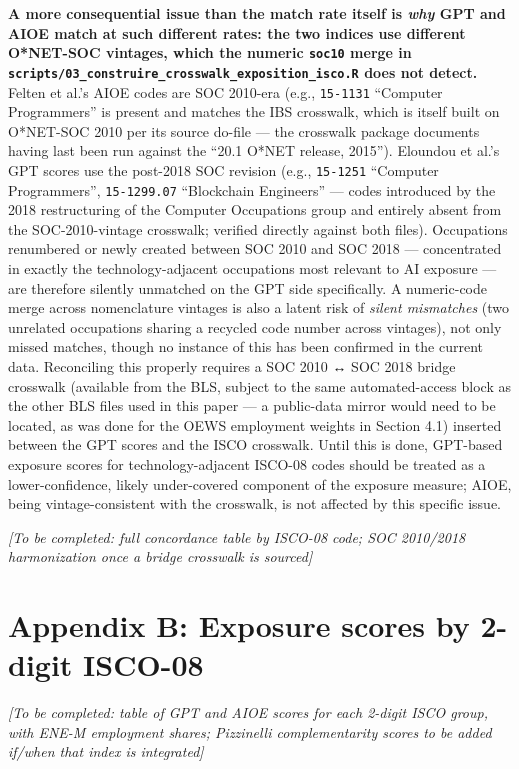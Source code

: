 \documentclass[
  11pt,
]{article}
\begin{document}
\textbf{A more consequential issue than the match rate itself is
\emph{why} GPT and AIOE match at such different rates: the two indices
use different O*NET-SOC vintages, which the numeric \texttt{soc10} merge
in \texttt{scripts/03\_construire\_crosswalk\_exposition\_isco.R} does
not detect.} Felten et al.'s AIOE codes are SOC 2010-era (e.g.,
\texttt{15-1131} ``Computer Programmers'' is present and matches the IBS
crosswalk, which is itself built on O*NET-SOC 2010 per its source
do-file --- the crosswalk package documents having last been run against
the ``20.1 O*NET release, 2015''). Eloundou et al.'s GPT scores use the
post-2018 SOC revision (e.g., \texttt{15-1251} ``Computer Programmers'',
\texttt{15-1299.07} ``Blockchain Engineers'' --- codes introduced by the
2018 restructuring of the Computer Occupations group and entirely absent
from the SOC-2010-vintage crosswalk; verified directly against both
files). Occupations renumbered or newly created between SOC 2010 and SOC
2018 --- concentrated in exactly the technology-adjacent occupations
most relevant to AI exposure --- are therefore silently unmatched on the
GPT side specifically. A numeric-code merge across nomenclature vintages
is also a latent risk of \emph{silent mismatches} (two unrelated
occupations sharing a recycled code number across vintages), not only
missed matches, though no instance of this has been confirmed in the
current data. Reconciling this properly requires a SOC 2010 ↔ SOC 2018
bridge crosswalk (available from the BLS, subject to the same
automated-access block as the other BLS files used in this paper --- a
public-data mirror would need to be located, as was done for the OEWS
employment weights in Section 4.1) inserted between the GPT scores and
the ISCO crosswalk. Until this is done, GPT-based exposure scores for
technology-adjacent ISCO-08 codes should be treated as a
lower-confidence, likely under-covered component of the exposure
measure; AIOE, being vintage-consistent with the crosswalk, is not
affected by this specific issue.

\emph{{[}To be completed: full concordance table by ISCO-08 code; SOC
2010/2018 harmonization once a bridge crosswalk is sourced{]}}

\section{Appendix B: Exposure scores by 2-digit
ISCO-08}\label{appendix-b-exposure-scores-by-2-digit-isco-08}

\emph{{[}To be completed: table of GPT and AIOE scores for each 2-digit
ISCO group, with ENE-M employment shares; Pizzinelli complementarity
scores to be added if/when that index is integrated{]}}
\end{document}
